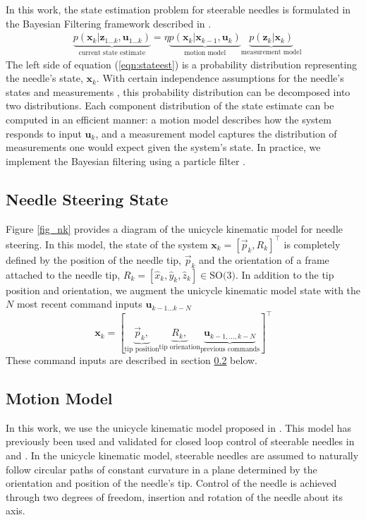 \documentclass[journal,transmag]{IEEEtran}
\newcommand{\bvar}[2]{\mathbf{#1}_{#2}}
\newcommand{\stateest}[1][k]{p(\mathbf{x}_{#1}|\mathbf{z}_{1...#1},\mathbf{u}_{1...#1})}
\newcommand{\meas}[1][k]{p(\mathbf{z}_{#1}|\mathbf{x}_{#1})}
\newcommand{\motion}[1][k]{p(\mathbf{x}_{#1}|\mathbf{x}_{#1-1},\mathbf{u}_{#1})}
\begin{document}
In this work, the state estimation problem for steerable needles is formulated in the Bayesian Filtering framework described in \cite{Thrun:2005}.
\begin{align}  \label{eqn:stateest}
&\underbrace{\stateest}_{\text{current state estimate}} = \eta \underbrace{\motion}_{\text{motion model}} \underbrace{\meas}_{\text{measurement model}}
\end{align}
The left side of equation (\ref{eqn:stateest}) is a probability distribution representing the needle's state, $\bvar{x}{k}$.  With certain independence assumptions for the needle's states and measurements \cite{Thrun:2005}, this probability distribution can be decomposed into two distributions. Each component distribution of the state estimate can be computed in an efficient manner:  a motion model describes how the system responds to input $\bvar{u}{k}$, and a measurement model captures the distribution of measurements one would expect given the system's state.   In practice, we implement the Bayesian filtering using a particle filter \cite{Thrun:2005}.


\subsection{Needle Steering State} \label{subsec:state}
Figure \ref{fig_nk} provides a diagram of the unicycle kinematic model for needle steering.  In this model, the state of the system $\bvar{x}{k} =  \left[\vec{p}_k, R_k\right]^\top$ is completely defined by the position of the needle tip, $\vec{p}_k$ and the orientation of a frame attached to the needle tip, $R_k = \left[\hat{x}_k,\hat{y}_k,\hat{z}_k\right] \in \text{SO(3)}$.  In addition to the tip position and orientation,  we augment the unicycle kinematic model state with the $N$ most recent command inputs $\bvar{u}{k-1...k-N}$
\begin{equation*}
\bvar{x}{k} =  \left[\underbrace{\vec{p}_k,}_{\text{tip position}} \underbrace{R_k,}_{\text{tip orienation}} \underbrace{\bvar{u}{k-1,...,k-N}}_{\text{previous commands}}\right]^\top
\end{equation*}
These command inputs are described in section \ref{subsec:unicycle} below.


\subsection{Motion Model} \label{subsec:unicycle}
In this work, we use the unicycle kinematic model proposed in \cite{Park2005}.  This model has previously been used and validated for closed loop control of steerable needles in \cite{Majewicz2013} and \cite{adebar2014recursive}.  In the unicycle kinematic model, steerable needles are assumed to naturally follow circular paths of constant curvature in a plane determined by the orientation and position of the needle's tip.  Control of the needle is achieved through two degrees of freedom, insertion and rotation of the needle about its axis.
\end{document}
